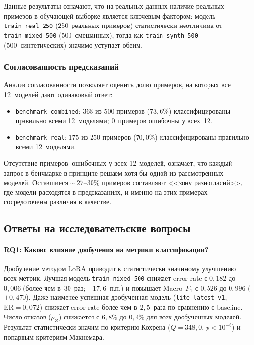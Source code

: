 Данные результаты означают, что на реальных данных наличие реальных примеров в обучающей выборке является ключевым фактором: модель \texttt{train\_real\_250} (250~реальных примеров) статистически неотличима от \texttt{train\_mixed\_500} (500~смешанных), тогда как \texttt{train\_synth\_500} (500~синтетических) значимо уступает обеим.

\subsubsection{Согласованность предсказаний}

Анализ согласованности позволяет оценить долю примеров, на которых все 12~моделей дают одинаковый ответ:
\begin{itemize}
    \item \texttt{benchmark-combined}: $368$ из $500$ примеров ($73{,}6\%$) классифицированы правильно всеми 12~моделями; $0$~примеров ошибочны у всех~12.
    \item \texttt{benchmark-real}: $175$ из $250$ примеров ($70{,}0\%$) классифицированы правильно всеми 12~моделями.
\end{itemize}

Отсутствие примеров, ошибочных у всех 12~моделей, означает, что каждый запрос в бенчмарке в принципе решаем хотя бы одной из рассмотренных моделей. Оставшиеся ${\sim}\,27\text{--}30\%$ примеров составляют <<зону разногласий>>, где модели расходятся в предсказаниях, и именно на этих примерах сосредоточены различия в качестве.

\subsection{Ответы на исследовательские вопросы} \label{subsec:rq_answers}

\paragraph{\textsc{RQ1}: Каково влияние дообучения на метрики классификации?}

Дообучение методом LoRA приводит к статистически значимому улучшению всех метрик. Лучшая модель \texttt{train\_mixed\_500} снижает error rate с $0{,}182$ до $0{,}006$ (более чем в~$30$~раз; $-17{,}6$~п.п.) и повышает Macro~$F_1$ с $0{,}526$ до $0{,}996$ ($+0{,}470$). Даже наименее успешная дообученная модель (\texttt{lite\_latest\_v1}, $\mathrm{ER} = 0{,}072$) снижает error rate более чем в~$2{,}5$~раза по сравнению с baseline. Число отказов ($\rho_\varnothing$) снижается с $6{,}8\%$ до $0{,}4\%$ для всех дообученных моделей. Результат статистически значим по критерию Кохрена ($Q = 348{,}0$, $p < 10^{-6}$) и попарным критериям Макнемара.

